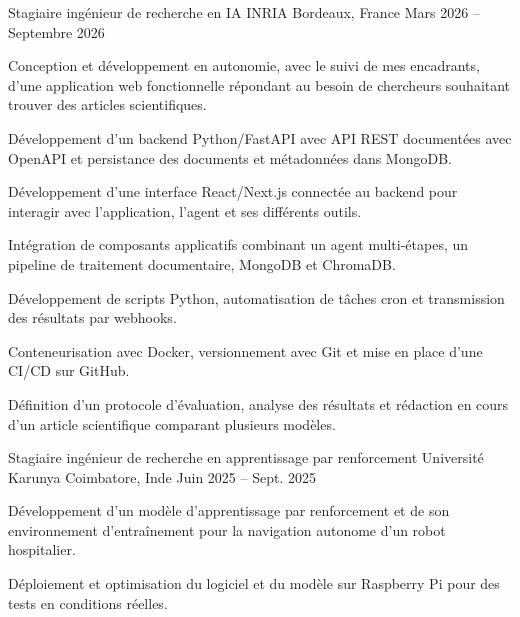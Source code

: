 
\begin{cventries}
  \cventry
    {Stagiaire ingénieur de recherche en IA}
    {INRIA}
    {Bordeaux, France}
    {Mars 2026 -- Septembre 2026}
    {
      \begin{cvitems}
        \item {Conception et développement en autonomie, avec le suivi de mes encadrants, d’une application web fonctionnelle répondant au besoin de chercheurs souhaitant trouver des articles scientifiques.}
        \item {Développement d’un backend Python/FastAPI avec API REST documentées avec OpenAPI et persistance des documents et métadonnées dans MongoDB.}
        \item {Développement d’une interface React/Next.js connectée au backend pour interagir avec l’application, l’agent et ses différents outils.}
        \item {Intégration de composants applicatifs combinant un agent multi-étapes, un pipeline de traitement documentaire, MongoDB et ChromaDB.}
        \item {Développement de scripts Python, automatisation de tâches cron et transmission des résultats par webhooks.}
        \item {Conteneurisation avec Docker, versionnement avec Git et mise en place d’une CI/CD sur GitHub.}
        \item {Définition d’un protocole d’évaluation, analyse des résultats et rédaction en cours d’un article scientifique comparant plusieurs modèles.}
      \end{cvitems}
    }

  \cventry
    {Stagiaire ingénieur de recherche en apprentissage par renforcement}
    {Université Karunya}
    {Coimbatore, Inde}
    {Juin 2025 -- Sept. 2025}
    {
      \begin{cvitems}
        \item {Développement d’un modèle d’apprentissage par renforcement et de son environnement d’entraînement pour la navigation autonome d’un robot hospitalier.}
        \item {Déploiement et optimisation du logiciel et du modèle sur Raspberry Pi pour des tests en conditions réelles.}
      \end{cvitems}
    }
\end{cventries}
